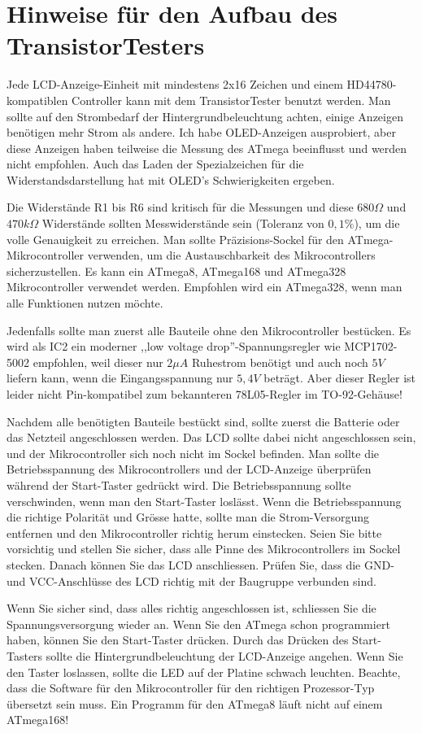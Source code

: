 \section{Hinweise für den Aufbau des TransistorTesters}
Jede LCD-Anzeige-Einheit mit mindestens 2x16 Zeichen und einem HD44780-kompatiblen Controller kann mit
dem TransistorTester benutzt werden.
Man sollte auf den Strombedarf der Hintergrundbeleuchtung achten, einige Anzeigen benötigen
mehr Strom als andere.
Ich habe OLED-Anzeigen ausprobiert, aber diese Anzeigen haben teilweise die Messung des
ATmega beeinflusst und werden nicht empfohlen. Auch das Laden der Spezialzeichen für die 
Widerstandsdarstellung hat mit OLED's Schwierigkeiten ergeben.

Die Widerstände R1 bis R6 sind kritisch für die Messungen und diese \(680\Omega\) und
\(470k\Omega\) Widerstände sollten Messwiderstände sein (Toleranz von \(0,1\%\)), um 
die volle Genauigkeit zu erreichen.
Man sollte Präzisions-Sockel für den ATmega-Mikrocontroller verwenden, um
die Austauschbarkeit des Mikrocontrollers sicherzustellen.
Es kann ein ATmega8, ATmega168 und ATmega328 Mikrocontroller verwendet werden.
Empfohlen wird ein ATmega328, wenn man alle Funktionen nutzen möchte.

Jedenfalls sollte man zuerst alle Bauteile ohne den Mikrocontroller bestücken.
Es wird als IC2 ein moderner ,,low voltage drop''-Spannungsregler wie MCP1702-5002 empfohlen, weil
dieser nur \(2\mu A\) Ruhestrom benötigt und auch noch \(5V\) liefern kann, 
 wenn die Eingangsspannung nur \(5,4V\) beträgt.
Aber dieser Regler ist leider nicht Pin-kompatibel zum bekannteren 78L05-Regler im TO-92-Gehäuse!

Nachdem alle benötigten Bauteile bestückt sind, sollte zuerst die Batterie
oder das Netzteil angeschlossen werden. Das LCD sollte dabei nicht angeschlossen sein, und der Mikrocontroller sich noch nicht im Sockel befinden.
Man sollte die Betriebsspannung des Mikrocontrollers und der LCD-Anzeige
überprüfen während der Start-Taster gedrückt wird.
Die Betriebsspannung sollte verschwinden, wenn man den Start-Taster loslässt.
Wenn die Betriebsspannung die richtige Polarität und Grösse hatte,
sollte man die Strom-Versorgung entfernen und den Mikrocontroller 
richtig herum einstecken. Seien Sie bitte vorsichtig und stellen Sie sicher,
dass alle Pinne des Mikrocontrollers im Sockel stecken.
Danach können Sie das LCD anschliessen. Prüfen Sie, dass die GND- und VCC-Anschlüsse des LCD richtig mit der Baugruppe verbunden sind.

Wenn Sie sicher sind, dass alles richtig angeschlossen ist, schliessen Sie
die Spannungsversorgung wieder an.
Wenn Sie den ATmega schon programmiert haben, können Sie den Start-Taster
drücken.
Durch das Drücken des Start-Tasters sollte die Hintergrundbeleuchtung
der LCD-Anzeige angehen.
Wenn Sie den Taster loslassen, sollte die LED auf der Platine schwach leuchten.
Beachte, dass die Software für den Mikrocontroller für den richtigen
Prozessor-Typ übersetzt sein muss. Ein Programm für den ATmega8 läuft
nicht auf einem ATmega168!

